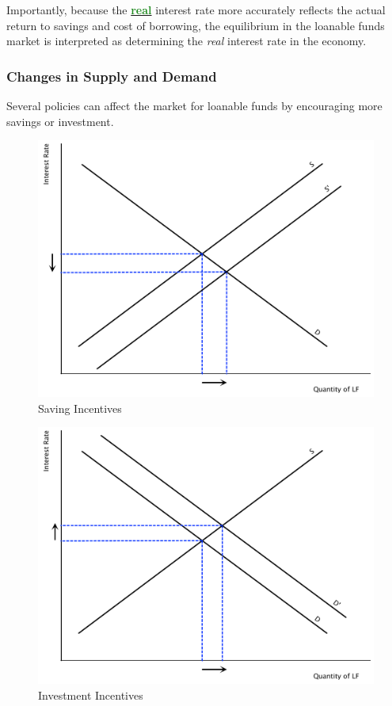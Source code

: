 \documentclass[11pt]{article}\usepackage[]{graphicx}\usepackage[]{color}
\theoremstyle{definition}
\newcommand{\dd}[1]{{\underline{\textbf{\textcolor{ForestGreen}{#1}}}}}
\begin{document}
Importantly, because the \dd{real} interest rate more accurately reflects the actual return to savings and cost of borrowing, the equilibrium in the loanable funds market is interpreted as determining the \textit{real} interest rate in the economy.


\subsubsection*{Changes in Supply and Demand}

Several policies can affect the market for loanable funds by encouraging more savings or investment. 

	
		\begin{figure}[H]
			\centering
			\includegraphics[scale=.40]{plot90.pdf}
			\caption{Saving Incentives}
		\end{figure}

	
		\begin{figure}[H]
			\centering
			\includegraphics[scale=.40]{plot91.pdf}
			\caption{Investment Incentives}
		\end{figure}
	
\end{document}

